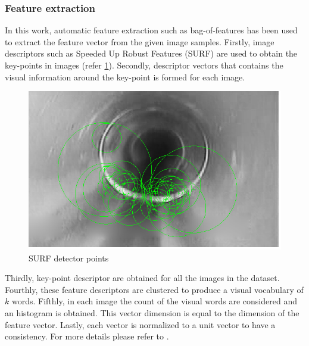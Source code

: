\documentclass[letterpaper,12pt, onecolumn]{article}%
\begin{document}
\subsubsection*{Feature extraction}
In this work, automatic feature extraction such as bag-of-features has been used to extract the feature vector from the given image samples. Firstly, image descriptors such as Speeded Up Robust Features (SURF) are used to obtain the key-points in images (refer \cref{fig:surfPoints}). Secondly, descriptor vectors that contains the visual information around the key-point is formed for each image. 
\begin{figure}[!hbtp]
 	  \centering
 	   \includegraphics[scale=0.5] {surf.png} 
 	   \caption{SURF detector points}
       \label{fig:surfPoints}
\end{figure}
Thirdly, key-point descriptor are obtained for all the images in the dataset. Fourthly, these feature descriptors are clustered to produce a visual vocabulary of $k$ words. Fifthly, in each image the count of the visual words are considered and an histogram is obtained. This vector dimension is equal to the dimension of the feature vector. Lastly, each vector is normalized to a unit vector to have a consistency. For more details please refer to \cite{csurka2004visual}.
\end{document}
